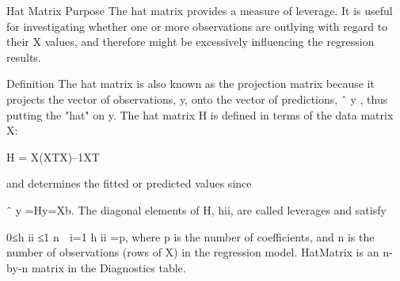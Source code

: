 

Hat Matrix
Purpose
The hat matrix provides a measure of leverage. It is useful for investigating whether one or more observations are outlying with regard to their X values, and therefore might be excessively influencing the regression results.

Definition
The hat matrix is also known as the projection matrix because it projects the vector of observations, y, onto the vector of predictions, 
ˆ
y
, thus putting the "hat" on y. The hat matrix H is defined in terms of the data matrix X:

H = X(XTX)–1XT

and determines the fitted or predicted values since

ˆ
y
=Hy=Xb.
The diagonal elements of H, hii, are called leverages and satisfy

0≤h
ii
≤1
n

i=1
h
ii
=p,
where p is the number of coefficients, and n is the number of observations (rows of X) in the regression model. HatMatrix is an n-by-n matrix in the Diagnostics table.
